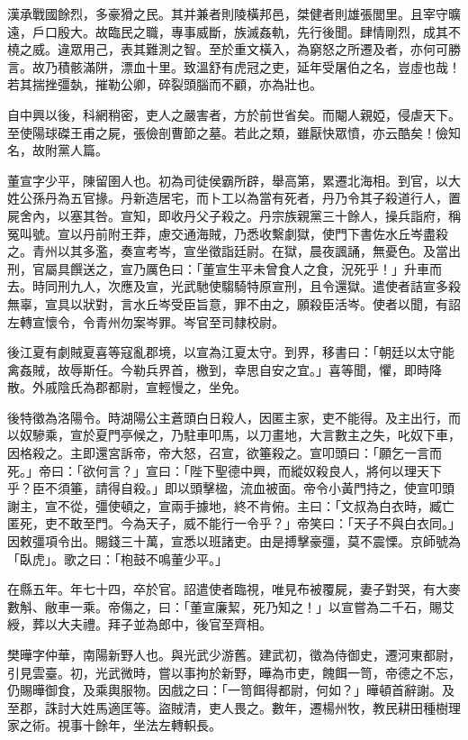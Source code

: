 
\begin{pinyinscope}
漢承戰國餘烈，多豪猾之民。其并兼者則陵橫邦邑，桀健者則雄張閭里。且宰守曠遠，戶口殷大。故臨民之職，專事威斷，族滅姦軌，先行後聞。肆情剛烈，成其不橈之威。違眾用己，表其難測之智。至於重文橫入，為窮怒之所遷及者，亦何可勝言。故乃積骸滿阱，漂血十里。致溫舒有虎冠之吏，延年受屠伯之名，豈虛也哉！若其揣挫彊埶，摧勒公卿，碎裂頭腦而不顧，亦為壯也。

自中興以後，科網稍密，吏人之嚴害者，方於前世省矣。而閹人親婭，侵虐天下。至使陽球磔王甫之屍，張儉剖曹節之墓。若此之類，雖厭快眾憤，亦云酷矣！儉知名，故附黨人篇。

董宣字少平，陳留圉人也。初為司徒侯霸所辟，舉高第，累遷北海相。到官，以大姓公孫丹為五官掾。丹新造居宅，而卜工以為當有死者，丹乃令其子殺道行人，置屍舍內，以塞其咎。宣知，即收丹父子殺之。丹宗族親黨三十餘人，操兵詣府，稱冤叫號。宣以丹前附王莽，慮交通海賊，乃悉收繫劇獄，使門下書佐水丘岑盡殺之。青州以其多濫，奏宣考岑，宣坐徵詣廷尉。在獄，晨夜諷誦，無憂色。及當出刑，官屬具饌送之，宣乃厲色曰：「董宣生平未曾食人之食，況死乎！」升車而去。時同刑九人，次應及宣，光武馳使騶騎特原宣刑，且令還獄。遣使者詰宣多殺無辜，宣具以狀對，言水丘岑受臣旨意，罪不由之，願殺臣活岑。使者以聞，有詔左轉宣懷令，令青州勿案岑罪。岑官至司隸校尉。

後江夏有劇賊夏喜等寇亂郡境，以宣為江夏太守。到界，移書曰：「朝廷以太守能禽姦賊，故辱斯任。今勒兵界首，檄到，幸思自安之宜。」喜等聞，懼，即時降散。外戚陰氏為郡都尉，宣輕慢之，坐免。

後特徵為洛陽令。時湖陽公主蒼頭白日殺人，因匿主家，吏不能得。及主出行，而以奴驂乘，宣於夏門亭候之，乃駐車叩馬，以刀畫地，大言數主之失，叱奴下車，因格殺之。主即還宮訴帝，帝大怒，召宣，欲箠殺之。宣叩頭曰：「願乞一言而死。」帝曰：「欲何言？」宣曰：「陛下聖德中興，而縱奴殺良人，將何以理天下乎？臣不須箠，請得自殺。」即以頭擊楹，流血被面。帝令小黃門持之，使宣叩頭謝主，宣不從，彊使頓之，宣兩手據地，終不肯俯。主曰：「文叔為白衣時，臧亡匿死，吏不敢至門。今為天子，威不能行一令乎？」帝笑曰：「天子不與白衣同。」因敕彊項令出。賜錢三十萬，宣悉以班諸吏。由是搏擊豪彊，莫不震慄。京師號為「臥虎」。歌之曰：「枹鼓不鳴董少平。」

在縣五年。年七十四，卒於官。詔遣使者臨視，唯見布被覆屍，妻子對哭，有大麥數斛、敝車一乘。帝傷之，曰：「董宣廉絜，死乃知之！」以宣嘗為二千石，賜艾綬，葬以大夫禮。拜子並為郎中，後官至齊相。

樊曄字仲華，南陽新野人也。與光武少游舊。建武初，徵為侍御史，遷河東都尉，引見雲臺。初，光武微時，嘗以事拘於新野，曄為市吏，餽餌一笥，帝德之不忘，仍賜曄御食，及乘輿服物。因戲之曰：「一笥餌得都尉，何如？」曄頓首辭謝。及至郡，誅討大姓馬適匡等。盜賊清，吏人畏之。數年，遷楊州牧，教民耕田種樹理家之術。視事十餘年，坐法左轉軹長。


\end{pinyinscope}
